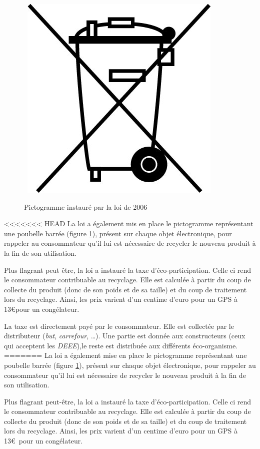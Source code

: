 \begin{figure}
~\includegraphics[scale=0.33]{Rsc/pictopoubellebarree.jpg} 
\caption{Pictogramme instauré par la loi de 2006}
\label{fig::picPoubelleBarree}
\end{figure} 
<<<<<<< HEAD
La loi a également mis en place le pictogramme représentant une poubelle barrée (figure \ref{fig::picPoubelleBarree}), présent sur chaque objet électronique, pour rappeler au consommateur qu'il lui est nécessaire de recycler le nouveau produit à la fin de son utilisation.

Plus flagrant peut être, la loi a instauré la taxe d'éco-participation. Celle ci rend le consommateur contribuable au recyclage. Elle est calculée à partir du coup de collecte du produit (donc de son poids et de sa taille) et du coup de traitement lors du recyclage. Ainsi, les prix varient d'un centime d'euro pour un GPS à 13\euro pour un congélateur. 

La taxe est directement payé par le consommateur. Elle est collectée par le distributeur (\textit{but}, \textit{carrefour}, \dots). Une partie est donnée aux constructeurs (ceux qui acceptent les \textit{DEEE}),le reste est distribuée aux différents éco-organisme. 
=======
La loi a également mise en place le pictogramme représentant une poubelle barrée (figure \ref{fig::picPoubelleBarree}), présent sur chaque objet électronique, pour rappeler au consommateur qu'il lui est nécessaire de recycler le nouveau produit à la fin de son utilisation.

Plus flagrant peut-être, la loi a instauré la taxe d'éco-participation. Celle ci rend le consommateur contribuable au recyclage. Elle est calculée à partir du coup de collecte du produit (donc de son poids et de sa taille) et du coup de traitement lors du recyclage. Ainsi, les prix varient d'un centime d'euro pour un GPS à 13\euro~pour un congélateur. 

